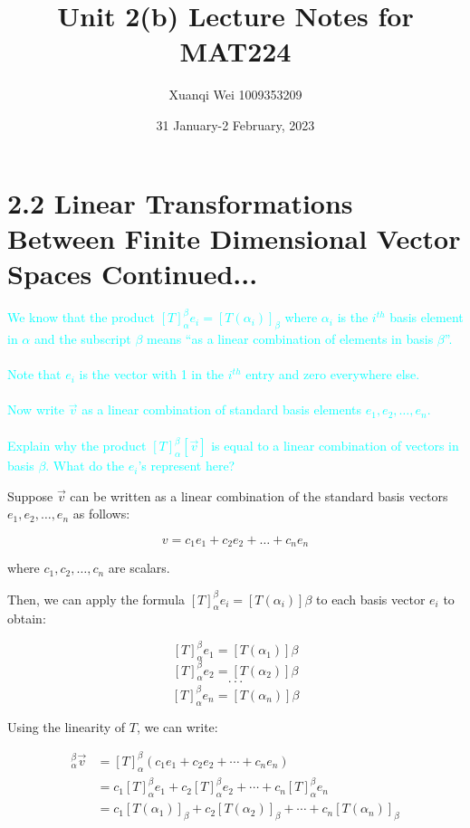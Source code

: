\documentclass[fontsize=12pt]{scrartcl}
\title{Unit 2(b) Lecture Notes for MAT224}
\author{Xuanqi Wei 1009353209}
\date{31 January-2 February, 2023}
\begin{document}
\maketitle

\newpage

\section{2.2 Linear Transformations Between Finite Dimensional Vector Spaces Continued...}

\noindent
\textcolor{cyan}{We know that the product $[T]_{\alpha}^{\beta}e_i = [T(\alpha_i)]_{\beta}$ where $\alpha_i$ is the $i^{th}$ basis element in $\alpha$ and the subscript $\beta$ means ``as a linear combination of elements in basis $\beta$''.}\\
\\
\textcolor{cyan}{Note that $e_i$ is the vector with 1 in the $i^{th}$ entry and zero everywhere else.}\\
\\
\textcolor{cyan}{Now write $\vec{v}$ as a linear combination of standard basis elements $e_1, e_2, \ldots , e_n$.}\\
\\
\textcolor{cyan}{Explain why the product $[T]_{\alpha}^{\beta}[\vec{v}]$ is equal to a linear combination of vectors in basis $\beta$. What do the $e_i$'s represent here?}

Suppose $\vec{v}$ can be written as a linear combination of the standard basis vectors $e_1, e_2, \ldots , e_n$ as follows:

$$v = c_1e_1+ c_2e_2 + \ldots + c_ne_n $$

\noindent
where $c_1, c_2, \ldots, c_n$ are scalars.

\noindent
Then, we can apply the formula $[T]_{\alpha}^{\beta}e_i = [T(\alpha_i)]{\beta}$ to each basis vector $e_i$ to obtain:

$$[T]_{\alpha}^{\beta}e_1 = [T(\alpha_1)]{\beta}$$
$$[T]_{\alpha}^{\beta}e_2 = [T(\alpha_2)]{\beta}$$
$$ \cdot \cdot \cdot $$
$$[T]_{\alpha}^{\beta}e_n = [T(\alpha_n)]{\beta}$$

Using the linearity of $T$, we can write:

\begin{align*}
[T]_{\alpha}^{\beta}\vec{v} &= [T]_{\alpha}^{\beta}(c_1e_1 + c_2e_2 + \cdots + c_ne_n)\\
&= c_1[T]_{\alpha}^{\beta}e_1 + c_2[T]_{\alpha}^{\beta}e_2 + \cdots + c_n[T]_{\alpha}^{\beta}e_n\\
&= c_1[T(\alpha_1)]_{\beta} + c_2[T(\alpha_2)]_{\beta} + \cdots + c_n[T(\alpha_n)]_{\beta}
\end{align*}
\end{document}
